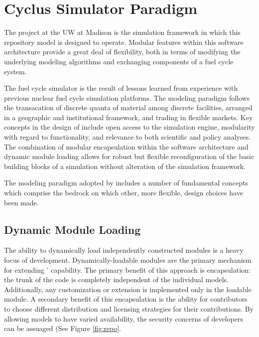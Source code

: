 \section{Cyclus Simulator Paradigm }

The \Cyclus project at the \gls{UW} at Madison is the 
simulation framework in which this repository model is designed to 
operate.  Modular features within this software architecture provide a 
great deal of flexibility, both in terms of modifying the underlying 
modeling algorithms and exchanging components of a fuel cycle system.

The \Cyclus fuel cycle simulator is the  result of lessons learned 
from experience with previous nuclear fuel cycle simulation platforms.  
The modeling paradigm follows the transacation of discrete quanta of 
material among discrete facilities, arranged in a geographic and 
institutional framework, and trading in
flexible markets. Key concepts in the design of \Cyclus include open
access to the simulation engine, modularity with regard to
functionality, and relevance to both scientific and policy
analyses. The combination of modular encapsulation within the
software architecture and dynamic module loading allows for robust but 
flexible reconfiguration of the basic building blocks of a simulation 
without alteration of the simulation framework.  

The modeling paradigm adopted by \Cyclus includes a number of
fundamental concepts which comprise the bedrock on which other, more
flexible, design choices have been made. 

\subsection{Dynamic Module Loading}

The ability to dynamically load independently constructed modules is a
heavy focus of \Cyclus development. Dynamically-loadable modules are
the primary mechanism for extending \Cyclus' capability. The primary
benefit of this approach is encapsulation: the trunk of the code is
completely independent of the individual models. Additionally, any
customization or extension is implemented only in the loadable
module. A secondary benefit of this encapsulation is the ability for
contributors to choose different distribution and licensing strategies
for their contributions. By allowing models to have varied
availability, the security concerns of developers can be
assuaged (See Figure \ref{fig:repo}. 

